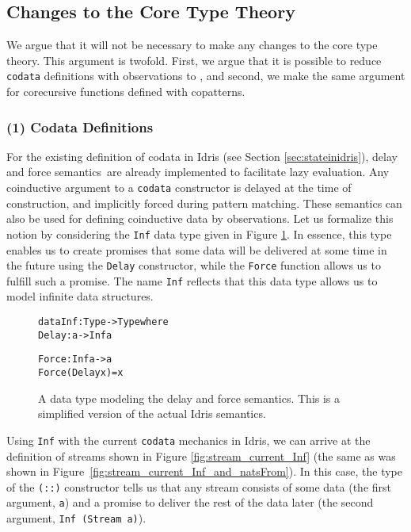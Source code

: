 \subsection{Changes to the Core Type Theory}
We argue that it will not be necessary to make any changes to the core type theory. This argument is twofold. First, we argue that it is possible to reduce \texttt{codata} definitions with observations to \TT, and second, we make the same argument for corecursive functions defined with copatterns.

\subsubsection{(1) Codata Definitions} For the existing definition of codata in Idris (see Section \ref{sec:stateinidris}), delay and force semantics\,\citep[Section 3.5]{Abelson96SICP} are already implemented to facilitate lazy evaluation. Any coinductive argument to a \texttt{codata} constructor is delayed at the time of construction, and implicitly forced during pattern matching. These semantics can also be used for defining coinductive data by observations. Let us formalize this notion by considering the \texttt{Inf} data type given in Figure \ref{fig:Inf_datatype}. In essence, this type enables us to create promises that some data will be delivered at some time in the future using the \texttt{Delay} constructor, while the \texttt{Force} function allows us to fulfill such a promise. The name \texttt{Inf} reflects that this data type allows us to model infinite data structures.

\begin{figure}
\begin{alltt}
data Inf : Type -> Type where
  Delay : a -> Inf a

Force : Inf a -> a
Force (Delay x) = x
\end{alltt}
\caption{A data type modeling the delay and force semantics. This is a simplified version of the actual Idris semantics.}
\label{fig:Inf_datatype}
\end{figure}

Using \texttt{Inf} with the current \texttt{codata} mechanics in Idris, we can arrive at the definition of streams shown in Figure \ref{fig:stream_current_Inf} (the same as was shown in Figure~\ref{fig:stream_current_Inf_and_natsFrom}). In this case, the type of the \texttt{(::)} constructor tells us that any stream consists of some data (the first argument, \texttt{a}) and a promise to deliver the rest of the data later (the second argument, \texttt{Inf (Stream a)}).

